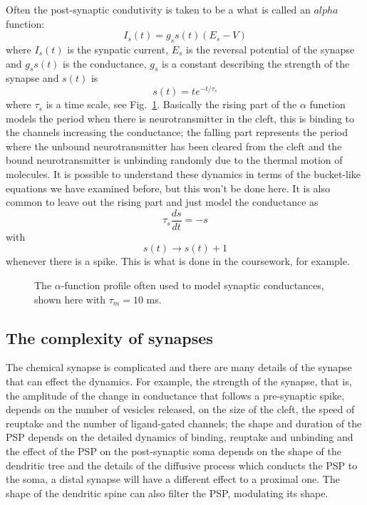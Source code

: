 \documentclass[11pt,a4paper]{scrartcl}
\begin{document}
Often the post-synaptic condutivity is taken to be a what is called an
$alpha$ function:
\begin{equation}
I_s(t)=g_ss(t)(E_s-V)
\end{equation}
where $I_s(t)$ is the synpatic current, $E_s$ is the reversal
potential of the synapse and $g_ss(t)$ is the conductance, $g_s$ is a
constant describing the strength of the synapse and $s(t)$ is 
\begin{equation}
s(t)=te^{-t/\tau_s}
\end{equation}
where $\tau_s$ is a time scale, see Fig.~\ref{fig:alpha}. Basically
the rising part of the $\alpha$ function models the period when there
is neurotransmitter in the cleft, this is binding to the channels
increasing the conductance; the falling part represents the period
where the unbound neurotransmitter has been cleared from the cleft and
the bound neurotransmitter is unbinding randomly due to the thermal
motion of molecules. It is possible to understand these dynamics in
terms of the bucket-like equations we have examined before, but this
won't be done here. It is also common to leave out the rising part and
just model the conductance as
\begin{equation}
\tau_s\frac{ds}{dt}=-s
\end{equation}
with
\begin{equation}
s(t)\rightarrow s(t)+1
\end{equation}
whenever there is a spike. This is what is done in the coursework, for
example.

\begin{figure}
\begin{center}

\end{center}
\caption{The $\alpha$-function profile often used to model synaptic
  conductances, shown here with $\tau_m=10$ ms.\label{fig:alpha}}
\end{figure}

\subsection*{The complexity of synapses}

The chemical synapse is complicated and there are many details of the
synapse that can effect the dynamics. For example, the strength of the
synapse, that is, the amplitude of the change in conductance that
follows a pre-synaptic spike, depends on the number of vesicles
released, on the size of the cleft, the speed of reuptake and the
number of ligand-gated channels; the shape and duration of the PSP
depends on the detailed dynamics of binding, reuptake and unbinding
and the effect of the PSP on the post-synaptic soma depends on the
shape of the dendritic tree and the details of the diffusive process
which conducts the PSP to the soma, a distal synapse will have a
different effect to a proximal one. The shape of the dendritic spine
can also filter the PSP, modulating its shape.
\end{document}
